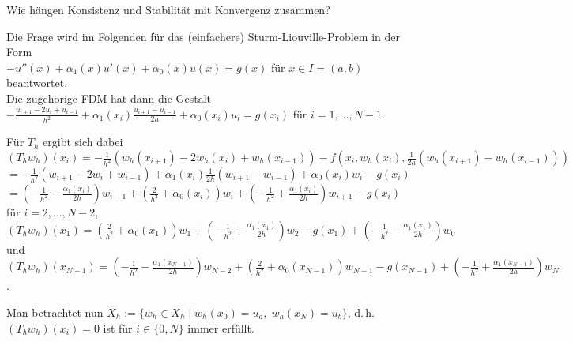 \begin{Bem}
    Wie hängen Konsistenz und Stabilität mit Konvergenz zusammen?
    
    Die Frage wird im Folgenden für das (einfachere) Sturm-Liouville-Problem
    in der Form\\
    $-u''(x) + \alpha_1(x) u'(x) + \alpha_0(x) u(x) = g(x)$ für
    $x \in I = (a, b)$ beantwortet.\\
    Die zugehörige FDM hat dann die Gestalt
    $-\frac{u_{i+1} - 2 u_i + u_{i-1}}{h^2} + \alpha_1(x_i)
    \frac{u_{i+1} - u_{i-1}}{2h} + \alpha_0(x_i) u_i = g(x_i)$
    für $i = 1, \dotsc, N - 1$.
    
    Für $T_h$ ergibt sich dabei\\
    $(T_h w_h)(x_i) =
    -\frac{1}{h^2} (w_h(x_{i+1}) - 2 w_h(x_i) + w_h(x_{i-1})) -
    f(x_i, w_h(x_i), \frac{1}{2h} (w_h(x_{i+1}) - w_h(x_{i-1})))$\\
    $= -\frac{1}{h^2} (w_{i+1} - 2w_i + w_{i-1}) +
    \alpha_1(x_i) \frac{1}{2h} (w_{i+1} - w_{i-1}) +
    \alpha_0(x_i) w_i - g(x_i)$\\
    $= (-\frac{1}{h^2} - \frac{\alpha_1(x_i)}{2h}) w_{i-1} +
    (\frac{2}{h^2} + \alpha_0(x_i)) w_i +
    (-\frac{1}{h^2} + \frac{\alpha_1(x_i)}{2h}) w_{i+1} - g(x_i)$
    für $i = 2, \dotsc, N - 2$,\\
    $(T_h w_h)(x_1) = (\frac{2}{h^2} + \alpha_0(x_1)) w_1 +
    (-\frac{1}{h^2} + \frac{\alpha_1(x_1)}{2h}) w_2 -
    g(x_1) + (-\frac{1}{h^2} - \frac{\alpha_1(x_1)}{2h}) w_0$ und\\
    $(T_h w_h)(x_{N-1}) =
    (-\frac{1}{h^2} - \frac{\alpha_1(x_{N-1})}{2h}) w_{N-2} +
    (\frac{2}{h^2} + \alpha_0(x_{N-1})) w_{N-1} -
    g(x_{N-1}) + (-\frac{1}{h^2} + \frac{\alpha_1(x_{N-1})}{2h}) w_N$.
    
    Man betrachtet nun $\widetilde{X}_h :=
    \{w_h \in X_h \;|\; w_h(x_0) = u_a,\; w_h(x_N) = u_b\}$, d.\,h.\\
    $(T_h w_h)(x_i) = 0$ ist für $i \in \{0, N\}$ immer erfüllt.
    

\end{Bem}

